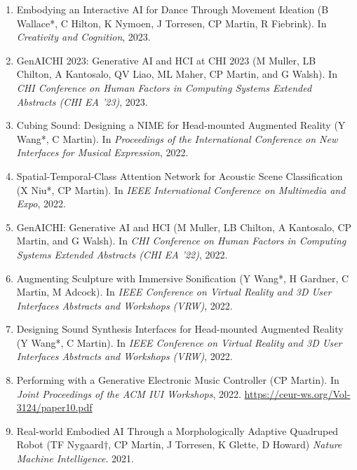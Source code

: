 \documentclass[11pt, a4paper, oneside]{article}
\begin{document}
\begin{enumerate}
\item Embodying an Interactive AI for Dance Through Movement Ideation 
(B Wallace*, C Hilton, K Nymoen, J Torresen, CP Martin, R Fiebrink). 
In \emph{Creativity and Cognition}, 2023. 

\item GenAICHI 2023: Generative AI and HCI at CHI 2023 (M Muller, LB Chilton, A
Kantosalo, QV Liao, ML Maher, CP Martin, and G Walsh). In \emph{CHI Conference on Human
Factors in Computing Systems Extended Abstracts (CHI EA '23)}, 2023. 

\item Cubing Sound: Designing a NIME for Head-mounted Augmented Reality (Y Wang*, C Martin). In  \emph{Proceedings of the
    International Conference on New Interfaces for Musical
    Expression}, 2022. 
    
\item Spatial-Temporal-Class Attention Network for Acoustic Scene Classification 
(X Niu*, CP Martin). In \emph{IEEE International Conference on Multimedia and Expo}, 
2022. 

\item GenAICHI: Generative AI and HCI (M Muller, LB Chilton, A
		Kantosalo, CP Martin, and G Walsh). In \emph{CHI Conference on Human
		Factors in Computing Systems Extended Abstracts (CHI EA '22)}, 2022.
		
\item Augmenting Sculpture with Immersive Sonification (Y Wang*, H Gardner, C Martin, M Adcock). In \emph{IEEE Conference on Virtual Reality and 3D User Interfaces Abstracts and Workshops (VRW)}, 2022. 

\item Designing Sound Synthesis Interfaces for Head-mounted Augmented Reality (Y Wang*, C Martin). In \emph{IEEE Conference on Virtual Reality and 3D User Interfaces Abstracts and Workshops (VRW)}, 2022. 

\item Performing with a Generative Electronic Music Controller (CP Martin). In \emph{Joint Proceedings of the ACM IUI Workshops}, 2022. \url{https://ceur-ws.org/Vol-3124/paper10.pdf}

\item Real-world Embodied AI Through a Morphologically Adaptive
  Quadruped Robot (TF Nygaard$\dagger$, CP Martin, J Torresen, K
  Glette, D Howard) \emph{Nature Machine Intelligence}. 2021.


\end{enumerate}
\end{document}
